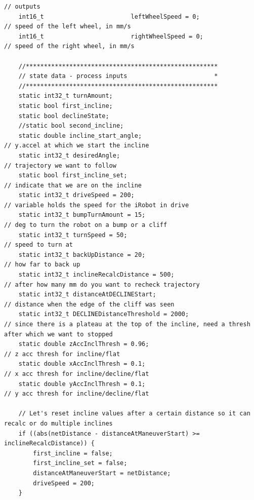 \documentclass[twoside]{article}
\begin{document}
\begin{lstlisting}[mathescape, frame=single]
    // outputs
    int16_t                        leftWheelSpeed = 0;                	// speed of the left wheel, in mm/s
    int16_t                        rightWheelSpeed = 0;            		// speed of the right wheel, in mm/s

    //*****************************************************
    // state data - process inputs                        *
    //*****************************************************
    static int32_t turnAmount;
    static bool first_incline;
    static bool declineState;
    //static bool second_incline;
    static double incline_start_angle;									// y.accel at which we start the incline
    static int32_t desiredAngle;										// trajectory we want to follow
    static bool first_incline_set;										// indicate that we are on the incline
    static int32_t driveSpeed = 200;									// variable holds the speed for the iRobot in drive
    static int32_t bumpTurnAmount = 15;									// deg to turn the robot on a bump or a cliff	
    static int32_t turnSpeed = 50;										// speed to turn at
    static int32_t backUpDistance = 20;									// how far to back up
    static int32_t inclineRecalcDistance = 500;							// after how many mm do you want to recheck trajectory
    static int32_t distanceAtDECLINEStart;								// distance when the edge of the cliff was seen
    static int32_t DECLINEDistanceThreshold = 2000;						// since there is a plateau at the top of the incline, need a thresh after which we want to stopped
    static double zAccInclThresh = 0.96;								// z acc thresh for incline/flat
    static double xAccInclThresh = 0.1;									// x acc thresh for incline/decline/flat
    static double yAccInclThresh = 0.1;									// y acc thresh for incline/decline/flat

	// Let's reset incline values after a certain distance so it can recalc or do multiple inclines
    if ((abs(netDistance - distanceAtManeuverStart) >= inclineRecalcDistance)) {
        first_incline = false;
        first_incline_set = false;
        distanceAtManeuverStart = netDistance;
        driveSpeed = 200;
    }



\end{lstlisting}
\end{document}
